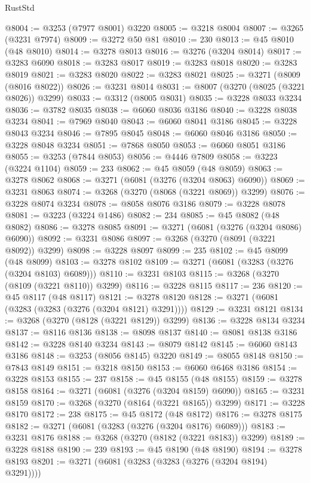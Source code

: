\begin{lexlean}{RustStd}
\begin{coremodule}
{\begin{coremodule}
{{{{{{{{{{{{{{{{{{{{{{{{{{{{{{{{{{{{{@8004 := @3253 (@7977 @8001) @3220
@8005 := @3218 @8004
@8007 := @3265 (@3231 @7974)
@8009 := @3272 @50 @81
@8010 := 230
@8013 := @45 @8010 (@48 @8010)
@8014 := @3278 @8013
@8016 := @3276 (@3204 @8014)
@8017 := @3283 @6090
@8018 := @3283 @8017
@8019 := @3283 @8018
@8020 := @3283 @8019
@8021 := @3283 @8020
@8022 := @3283 @8021
@8025 := @3271 (@8009 (@8016 @8022))
@8026 := @3231 @8014
@8031 := @8007 (@3270 (@8025 (@3221 @8026)) @3299)
@8033 := @3312 (@8005 @8031)
@8035 := @3228 @8033 @3234
@8036 := @3782 @8035
@8038 := @6060 @8036 @3186
@8040 := @3228 @8038 @3234
@8041 := @7969 @8040
@8043 := @6060 @8041 @3186
@8045 := @3228 @8043 @3234
@8046 := @7895 @8045
@8048 := @6060 @8046 @3186
@8050 := @3228 @8048 @3234
@8051 := @7868 @8050
@8053 := @6060 @8051 @3186
@8055 := @3253 (@7844 @8053)
@8056 := @4446 @7809
@8058 := @3223 (@3224 @1104)
@8059 := 233
@8062 := @45 @8059 (@48 @8059)
@8063 := @3278 @8062
@8068 := @3271 (@6081 (@3276 (@3204 @8063) @6090))
@8069 := @3231 @8063
@8074 := @3268 (@3270 (@8068 (@3221 @8069)) @3299)
@8076 := @3228 @8074 @3234
@8078 := @8058 @8076 @3186
@8079 := @3228 @8078
@8081 := @3223 (@3224 @1486)
@8082 := 234
@8085 := @45 @8082 (@48 @8082)
@8086 := @3278 @8085
@8091 := @3271 (@6081 (@3276 (@3204 @8086) @6090))
@8092 := @3231 @8086
@8097 := @3268 (@3270 (@8091 (@3221 @8092)) @3299)
@8098 := @3228 @8097
@8099 := 235
@8102 := @45 @8099 (@48 @8099)
@8103 := @3278 @8102
@8109 := @3271 (@6081 (@3283 (@3276 (@3204 @8103) @6089)))
@8110 := @3231 @8103
@8115 := @3268 (@3270 (@8109 (@3221 @8110)) @3299)
@8116 := @3228 @8115
@8117 := 236
@8120 := @45 @8117 (@48 @8117)
@8121 := @3278 @8120
@8128 := @3271 (@6081 (@3283 (@3283 (@3276 (@3204 @8121) @3291))))
@8129 := @3231 @8121
@8134 := @3268 (@3270 (@8128 (@3221 @8129)) @3299)
@8136 := @3228 @8134 @3234
@8137 := @8116 @8136
@8138 := @8098 @8137
@8140 := @8081 @8138 @3186
@8142 := @3228 @8140 @3234
@8143 := @8079 @8142
@8145 := @6060 @8143 @3186
@8148 := @3253 (@8056 @8145) @3220
@8149 := @8055 @8148
@8150 := @7843 @8149
@8151 := @3218 @8150
@8153 := @6060 @6468 @3186
@8154 := @3228 @8153
@8155 := 237
@8158 := @45 @8155 (@48 @8155)
@8159 := @3278 @8158
@8164 := @3271 (@6081 (@3276 (@3204 @8159) @6090))
@8165 := @3231 @8159
@8170 := @3268 (@3270 (@8164 (@3221 @8165)) @3299)
@8171 := @3228 @8170
@8172 := 238
@8175 := @45 @8172 (@48 @8172)
@8176 := @3278 @8175
@8182 := @3271 (@6081 (@3283 (@3276 (@3204 @8176) @6089)))
@8183 := @3231 @8176
@8188 := @3268 (@3270 (@8182 (@3221 @8183)) @3299)
@8189 := @3228 @8188
@8190 := 239
@8193 := @45 @8190 (@48 @8190)
@8194 := @3278 @8193
@8201 := @3271 (@6081 (@3283 (@3283 (@3276 (@3204 @8194) @3291))))
}}}}}}}}}}}}}}}}}}}}}}}}}}}}}}}}}}}}}
\end{coremodule}}
\end{coremodule}
\end{lexlean}

